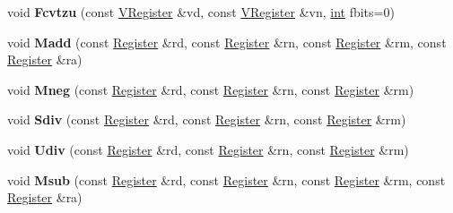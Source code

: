 \begin{DoxyCompactItemize}
void {\bfseries Fcvtzu} (const \mbox{\hyperlink{classv8_1_1internal_1_1VRegister}{V\+Register}} \&vd, const \mbox{\hyperlink{classv8_1_1internal_1_1VRegister}{V\+Register}} \&vn, \mbox{\hyperlink{classint}{int}} fbits=0)
\item 
\mbox{\label{classv8_1_1internal_1_1TurboAssembler_a95169d779a4c85f3252dc8c3a21e1025}} 
void {\bfseries Madd} (const \mbox{\hyperlink{classv8_1_1internal_1_1Register}{Register}} \&rd, const \mbox{\hyperlink{classv8_1_1internal_1_1Register}{Register}} \&rn, const \mbox{\hyperlink{classv8_1_1internal_1_1Register}{Register}} \&rm, const \mbox{\hyperlink{classv8_1_1internal_1_1Register}{Register}} \&ra)
\item 
\mbox{\label{classv8_1_1internal_1_1TurboAssembler_a0f4394a2921cb9db855cd1b64433fbc0}} 
void {\bfseries Mneg} (const \mbox{\hyperlink{classv8_1_1internal_1_1Register}{Register}} \&rd, const \mbox{\hyperlink{classv8_1_1internal_1_1Register}{Register}} \&rn, const \mbox{\hyperlink{classv8_1_1internal_1_1Register}{Register}} \&rm)
\item 
\mbox{\label{classv8_1_1internal_1_1TurboAssembler_a5d217c9cc54da936380264b67963f86a}} 
void {\bfseries Sdiv} (const \mbox{\hyperlink{classv8_1_1internal_1_1Register}{Register}} \&rd, const \mbox{\hyperlink{classv8_1_1internal_1_1Register}{Register}} \&rn, const \mbox{\hyperlink{classv8_1_1internal_1_1Register}{Register}} \&rm)
\item 
\mbox{\label{classv8_1_1internal_1_1TurboAssembler_a288caecd48cc242d219c3c4abf908718}} 
void {\bfseries Udiv} (const \mbox{\hyperlink{classv8_1_1internal_1_1Register}{Register}} \&rd, const \mbox{\hyperlink{classv8_1_1internal_1_1Register}{Register}} \&rn, const \mbox{\hyperlink{classv8_1_1internal_1_1Register}{Register}} \&rm)
\item 
\mbox{\label{classv8_1_1internal_1_1TurboAssembler_a3bb0ecac682e3127e8be0ae294279264}} 
void {\bfseries Msub} (const \mbox{\hyperlink{classv8_1_1internal_1_1Register}{Register}} \&rd, const \mbox{\hyperlink{classv8_1_1internal_1_1Register}{Register}} \&rn, const \mbox{\hyperlink{classv8_1_1internal_1_1Register}{Register}} \&rm, const \mbox{\hyperlink{classv8_1_1internal_1_1Register}{Register}} \&ra)

\end{DoxyCompactItemize}
